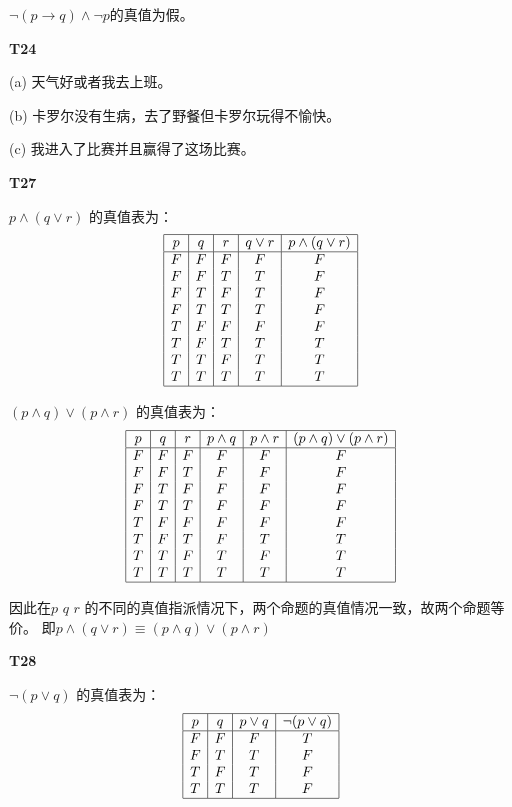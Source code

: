 \documentclass[12pt, a4paper]{ctexart}
\begin{document}
$\lnot (p \rightarrow q) \land \lnot p$的真值为假。

\textbf{T24}

(a) 天气好或者我去上班。

(b) 卡罗尔没有生病，去了野餐但卡罗尔玩得不愉快。

(c) 我进入了比赛并且赢得了这场比赛。

\textbf{T27}

$p \land (q \lor r)$ 的真值表为：
\[
\begin{array}{|c|c|c|c|c|}
    \hline
    p & q & r & q \lor r & p \land (q \lor r)\\
    \hline
    F & F & F & F & F\\
    F & F & T & T & F\\
    F & T & F & T & F\\
    F & T & T & T & F\\
    T & F & F & F & F\\
    T & F & T & T & T\\
    T & T & F & T & T\\
    T & T & T & T & T\\
    \hline
\end{array}
\]

$(p \land q) \lor (p \land r)$ 的真值表为：
\[
\begin{array}{|c|c|c|c|c|c|}
    \hline
    p & q & r & p \land q & p \land r & (p \land q) \lor (p \land r)\\
    \hline
    F & F & F & F & F & F\\
    F & F & T & F & F & F\\
    F & T & F & F & F & F\\
    F & T & T & F & F & F\\
    T & F & F & F & F & F\\
    T & F & T & F & T & T\\
    T & T & F & T & F & T\\
    T & T & T & T & T & T\\
    \hline    
\end{array}
\]

因此在$\textit{p q r}$ 的不同的真值指派情况下，两个命题的真值情况一致，故两个命题等价。
即$p \land (q \lor r) \equiv (p \land q) \lor (p \land r)$

\textbf{T28}

$\lnot (p \lor q)$ 的真值表为：
\[
\begin{array}{|c|c|c|c|}
    \hline
    p & q & p \lor q & \lnot (p \lor q)\\
    \hline
    F & F & F & T\\
    F & T & T & F\\
    T & F & T & F\\
    T & T & T & F\\
    \hline
\end{array}
\]
\end{document}
